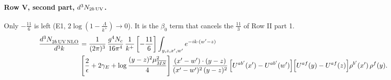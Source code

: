 \documentclass[10pt]{article}
\numberwithin{equation}{section}
\begin{document}
\paragraph{Row V, second part, $d^3N_{2b\,\rm UV}$.}
Only $-\frac{11}{6}$ is left (E1, $2\log(1-\frac{\Lambda}{k^+})\to0$). It is the $\beta_0$ term that cancels the $\frac{11}{3}$ of Row II part 1.
\begin{align}
\frac{d^{3}N_{2b\,\rm UV\, NLO}^{\rm}}{d^{3}k} & =  \frac{1}{(2\pi)^{3}}\,\frac{g^{4}N_{c}}{16\pi^{4}}\,\frac{1}{k^{+}}
\left[-\frac{11}{6}\right]\int_{y,z,x',w'}e^{-ik\cdot(w'-z)}\notag \\ & \left[\frac{2}{\epsilon}+2\gamma_{E}+\log\frac{(y-z)^{2}\mu^{2}_{\overline{MS}}}{4}\right]
\frac{(x'-w')\cdot(y-z)}{(x'-w')^{2}\,(y-z)^{2}}\, \Big[U^{ab'}(x')-U^{ab'}(w')\Big]\Big[U^{af}(y)-U^{af}(z)\Big]\rho^{b'}(x')\,\rho^{f}(y). \label{eq:F:G1V2bUV}
\end{align}
\end{document}
